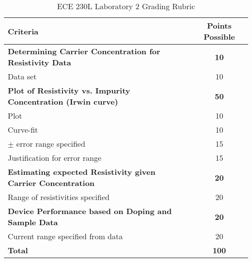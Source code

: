 \documentclass[12pt]{../manual}
\begin{document}
\newpage
{}
{}
\hspace{0pt}
\vfill
\begin{table}[ht!]
\caption{ECE 230L Laboratory 2 Grading Rubric}
\centering
\begin{tabular}{l|c} \hline
Criteria & Points Possible \\ \hline \hline
\textbf{Determining Carrier Concentration for Resistivity Data} & \textbf{10} \\ 
Data set & 10 \\ \hline
\textbf{Plot of Resistivity vs. Impurity Concentration (Irwin curve)} & \textbf{50} \\ 
            Plot & 10 \\ 
            Curve-fit & 10 \\ 
            $\pm$ error range specified & 15\\ 
              Justification for error range	& 15 \\ \hline
\textbf{Estimating expected Resistivity given Carrier Concentration} & \textbf{20} \\ 
Range of resistivities specified & 20 \\ \hline
\textbf{Device Performance based on Doping and Sample Data} & \textbf{20} \\ 
              Current range specified from data & 20 \\ \hline \hline
\textbf{Total}	& \textbf{100} \\ \hline
\end{tabular}
\end{table}
\vfill
%
\end{document}
